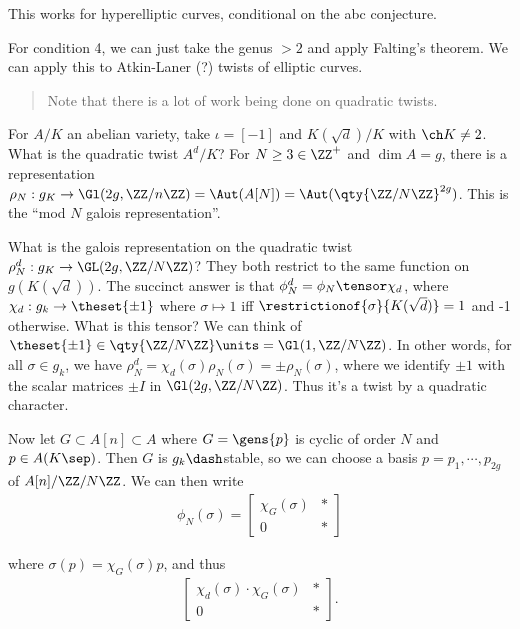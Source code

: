 This works for hyperelliptic curves, conditional on the abc conjecture.

For condition 4, we can just take the genus \(>2\) and apply Falting's
theorem. We can apply this to Atkin-Laner (?) twists of elliptic curves.

\begin{quote}
Note that there is a lot of work being done on quadratic twists.
\end{quote}

For \(A/K\) an abelian variety, take \(\iota = [-1]\) and
\(K(\sqrt{d}) / K\) with \(\ch K \neq 2\). What is the quadratic twist
\(A^d/K\)? For \(N\geq 3 \in \ZZ^+\) and \(\dim A = g\), there is a
representation
\(\rho_N: g_K \to \Gl(2g, \ZZ/n\ZZ) = \Aut(A[N]) =\Aut(\qty{\ZZ/N\ZZ}^{2g})\).
This is the ``mod \(N\) galois representation''.

What is the galois representation on the quadratic twist
\(\rho^d_N: g_K \to \GL(2g, \ZZ/N\ZZ)\)? They both restrict to the same
function on \(g(K(\sqrt d))\). The succinct answer is that
\(\phi^d_N = \phi_N \tensor \chi_d\), where
\(\chi_d: g_k \to \theset{\pm 1}\) where \(\sigma \mapsto 1\) iff
\(\restrictionof{\sigma}{K(\sqrt d)} = 1\) and -1 otherwise. What is
this tensor? We can think of
\(\theset{\pm 1}\in \qty{\ZZ/N\ZZ}\units = \Gl(1, \ZZ/N\ZZ)\). In other
words, for all \(\sigma \in g_k\), we have
\(\rho_N^d = \chi_d(\sigma) \rho_N(\sigma) = \pm \rho_N(\sigma)\), where
we identify \(\pm 1\) with the scalar matrices \(\pm I\) in
\(\Gl(2g, \ZZ/N\ZZ)\). Thus it's a twist by a quadratic character.

Now let \(G \subset A[n] \subset A\) where \(G = \gens{p}\) is cyclic of
order \(N\) and \(p\in A(K\sep)\). Then \(G\) is \(g_k\dash\)stable, so
we can choose a basis \(p = p_1, \cdots, p_{2g}\) of
\(A[n] / \ZZ/N\ZZ\). We can then write \begin{align*}
\phi_N(\sigma) =
\begin{bmatrix}
\chi_G(\sigma) & \ast \\
0 & \ast
\end{bmatrix}
\end{align*}

where \(\sigma(p) = \chi_G(\sigma) p\), and thus \begin{align*}
\begin{bmatrix}
\chi_d(\sigma) \cdot \chi_G(\sigma) & \ast \\
0 & \ast
\end{bmatrix}
.\end{align*}

